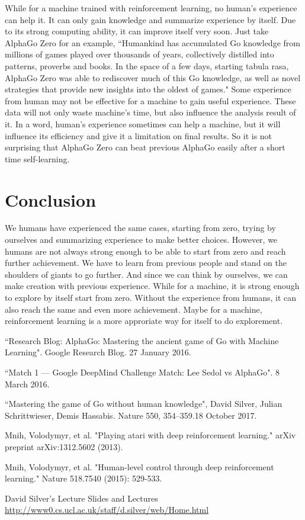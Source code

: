 \documentclass[a4paper,12pt]{article}
\begin{document}
While for a machine trained with reinforcement learning, no human's experience can help it. It can only gain knowledge and summarize experience by itself. Due to its strong computing ability, it can improve itself very soon. Just take AlphaGo Zero for an example, ``Humankind has accumulated Go knowledge from millions of games played over thousands of years, collectively distilled into patterns, proverbs and books. In the space of a few days, starting tabula rasa, AlphaGo Zero was able to rediscover much of this Go knowledge, as well as novel strategies that provide new insights into the oldest of games."\cite{case} Some experience from human may not be effective for a machine to gain useful experience. These data will not only waste machine's time, but also influence the analysis result of it. In a word, human's experience sometimes can help a machine, but it will influence its efficiency and give it a limitation on final results. So it is not surprising that AlphaGo Zero can beat previous AlphaGo easily after a short time self-learning.




\section{Conclusion}
We humans have experienced the same cases, starting from zero, trying by ourselves and summarizing experience to make better choices. However, we humans are not always strong enough to be able to start from zero and reach further achievement. We have to learn from previous people and stand on the shoulders of giants to go further. And since we can think by ourselves, we can make creation with previous experience. While for a machine, it is strong enough to explore by itself start from zero. Without the experience from humans, it can also reach the same and even more achievement. Maybe for a machine, reinforcement learning is a more approriate way for itself to do explorement.
\begin{thebibliography}{0}

``Research Blog: AlphaGo: Mastering the ancient game of Go with Machine Learning". Google Research Blog. 27 January 2016.

``Match 1 --– Google DeepMind Challenge Match: Lee Sedol vs AlphaGo". 8 March 2016.

``Mastering the game of Go without human knowledge", David Silver, Julian Schrittwieser, Demis Hassabis. Nature 550, 354–359.18 October 2017.

Mnih, Volodymyr, et al. "Playing atari with deep reinforcement learning." arXiv preprint arXiv:1312.5602 (2013).

Mnih, Volodymyr, et al. "Human-level control through deep reinforcement learning." Nature 518.7540 (2015): 529-533.

David Silver's Lecture Slides and Lectures \url{http://www0.cs.ucl.ac.uk/staff/d.silver/web/Home.html}
\end{thebibliography}
\end{document}
